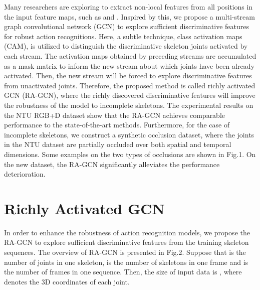 \documentclass{article}
\begin{document}
Many researchers are exploring to extract non-local features from all positions in the input feature maps, such as \cite{Wang2018} and \cite{Li2018c}. Inspired by this, we propose a multi-stream graph convolutional network (GCN) to explore sufficient discriminative features for robust action recognitions. Here, a subtle technique, class activation maps (CAM), is utilized to distinguish the discriminative skeleton joints activated by each stream. The activation maps obtained by preceding streams are accumulated as a mask matrix to inform the new stream about which joints have been already activated. Then, the new stream will be forced to explore discriminative features from unactivated joints. Therefore, the proposed method is called richly activated GCN (RA-GCN), where the richly discovered discriminative features will improve the robustness of the model to incomplete skeletons. The experimental results on the NTU RGB+D dataset \cite{Shahroudy2016} show that the RA-GCN achieves comparable performance to the state-of-the-art methods. Furthermore, for the case of incomplete skeletons, we construct a synthetic occlusion dataset, where the joints in the NTU dataset are partially occluded over both spatial and temporal dimensions. Some examples on the two types of occlusions are shown in Fig.1. On the new dataset, the RA-GCN significantly alleviates the performance deterioration.


\section{Richly Activated GCN}
\label{sec:RAGCN}

In order to enhance the robustness of action recognition models, we propose the RA-GCN to explore sufficient discriminative features from the training skeleton sequences. The overview of RA-GCN is presented in Fig.2. Suppose that  is the number of joints in one skeleton,  is the number of skeletons in one frame and  is the number of frames in one sequence. Then, the size of input data  is , where  denotes the 3D coordinates of each joint. 
\end{document}
